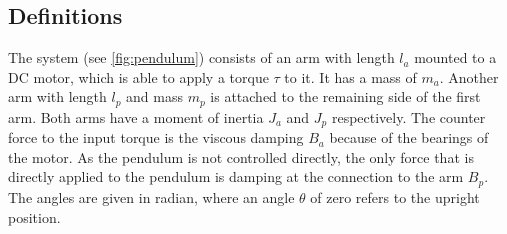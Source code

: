 \subsection{Definitions}
The system (see \ref{fig:pendulum}) consists of an arm with length $l_a$ 
mounted to a DC motor, which is 
able to apply a torque $\tau$ to it. It has a mass of $m_a$. Another arm with 
length $l_p$ and mass 
$m_p$
is attached to the remaining side of the 
first arm. Both arms have a moment of inertia $J_a$ and $J_p$ respectively. The 
counter force to the input torque is the viscous damping $B_a$ because of the 
bearings of the motor. As the pendulum is not controlled directly, the only 
force that is directly applied to the pendulum is damping at the connection to 
the arm $B_p$. The angles are given in radian, where an angle $\theta$ of zero 
refers to the upright position.

